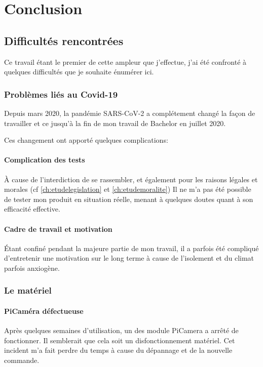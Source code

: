 \chapter{Conclusion}
\label{ch:conclusion}

\section{Difficultés rencontrées}
Ce travail étant le premier de cette ampleur que j'effectue, j'ai été
confronté à quelques difficultés que je souhaite énumérer ici.

\subsection{Problèmes liés au Covid-19}
Depuis mars 2020, la pandémie SARS-CoV-2 a complétement changé la façon
de travailler et ce jusqu'à la fin de mon travail de Bachelor en juillet 2020.

Ces changement ont apporté quelques complications:

\subsubsection{Complication des tests}
À cause de l'interdiction de se rassembler, et également pour les raisons légales et morales (cf \ref{ch:etudelegislation} et \ref{ch:etudemoralite})
Il ne m'a pas été possible de tester mon produit en situation réelle, menant à quelques doutes quant à son efficacité effective.

\subsubsection{Cadre de travail et motivation}
Étant confiné pendant la majeure partie de mon travail, il a parfois été compliqué
d'entretenir une motivation sur le long terme à cause de l'isolement et du climat parfois anxiogène.

\subsection{Le matériel}

\subsubsection{PiCaméra défectueuse}
Après quelques semaines d'utilisation, un des module PiCamera a arrêté de fonctionner.
Il semblerait que cela soit un disfonctionnement matériel. Cet incident m'a fait perdre du temps à cause du dépannage et de la nouvelle commande.


